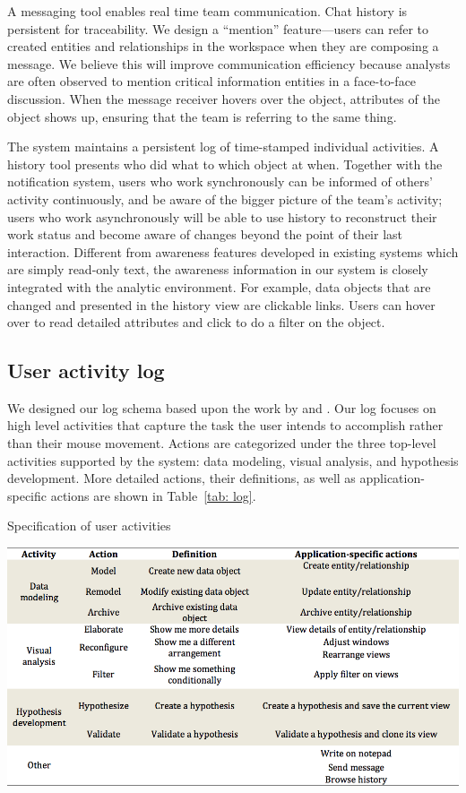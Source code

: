 A messaging tool enables real time team communication. Chat history is persistent
for traceability. We design a “mention” feature—users can refer to created
entities and relationships in the workspace when they are composing a message.
We believe this will improve communication efficiency because analysts are often
observed to mention critical information entities in a face-to-face discussion.
When the message receiver hovers over the object, attributes of the object shows
up, ensuring that the team is referring to the same thing.

The system maintains a persistent log of time-stamped individual activities. A
history tool presents who did what to which object at when. Together with the
notification system, users who work synchronously can be informed of others’
activity continuously, and be aware of the bigger picture of the team’s activity;
users who work asynchronously will be able to use history to reconstruct
their work status and become aware of changes beyond the point of their last
interaction. Different from awareness features developed in existing systems
which are simply read-only text, the awareness information in our system is
closely integrated with the analytic environment. For example, data objects that
are changed and presented in the history view are clickable links. Users can
hover over to read detailed attributes and click to do a filter on the object.

\subsection{User activity log}

We designed our log schema based upon the work by \cite{Yi2007} and
\cite{Guo2016}. Our log focuses on high level activities that capture the
task the user intends to accomplish rather than their mouse movement. Actions
are categorized under the three top-level activities supported by the system:
data modeling, visual analysis, and hypothesis development. More detailed
actions, their definitions, as well as application-specific actions are shown in
Table~\ref{tab: log}.

\begin{table}
	\caption{Specification of user activities}
	\label{tab: log}
	\includegraphics[width=\linewidth]{03-System/img/log_specification.png}
\end{table}


